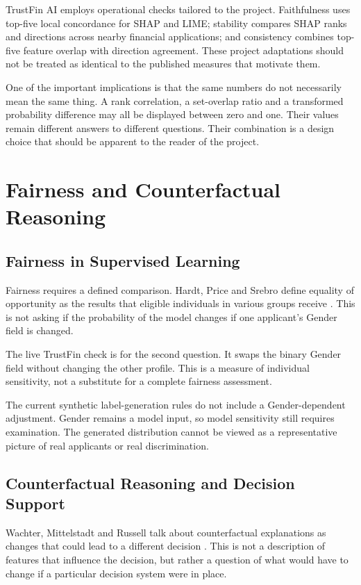 TrustFin AI employs operational checks tailored to the project. Faithfulness uses top-five local concordance for SHAP and LIME; stability compares SHAP ranks and directions across nearby financial applications; and consistency combines top-five feature overlap with direction agreement. These project adaptations should not be treated as identical to the published measures that motivate them.

One of the important implications is that the same numbers do not necessarily mean the same thing. A rank correlation, a set-overlap ratio and a transformed probability difference may all be displayed between zero and one. Their values remain different answers to different questions. Their combination is a design choice that should be apparent to the reader of the project.

\section{Fairness and Counterfactual Reasoning}
\subsection{Fairness in Supervised Learning}
Fairness requires a defined comparison. Hardt, Price and Srebro define equality of opportunity as the results that eligible individuals in various groups receive \cite{hardt2016}. This is not asking if the probability of the model changes if one applicant's Gender field is changed.

The live TrustFin check is for the second question. It swaps the binary Gender field without changing the other profile. This is a measure of individual sensitivity, not a substitute for a complete fairness assessment.

The current synthetic label-generation rules do not include a Gender-dependent adjustment. Gender remains a model input, so model sensitivity still requires examination. The generated distribution cannot be viewed as a representative picture of real applicants or real discrimination.

\subsection{Counterfactual Reasoning and Decision Support}
Wachter, Mittelstadt and Russell talk about counterfactual explanations as changes that could lead to a different decision \cite{wachter2018}. This is not a description of features that influence the decision, but rather a question of what would have to change if a particular decision system were in place.

